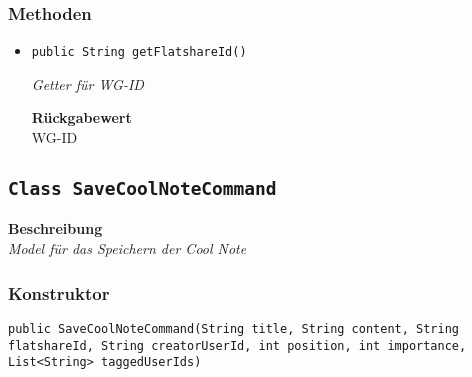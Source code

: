     \subsubsection{Methoden}
    \begin{itemize}
    	\item{\texttt{public String getFlatshareId()}}
    	
    	\textit{Getter für WG-ID}
    	
    	
    	
    	\textbf{Rückgabewert} \\
    	WG-ID
    \end{itemize}
    \subsection{\texttt{Class SaveCoolNoteCommand}}
    \textbf{Beschreibung} \\
    \textit{Model für das Speichern der Cool Note}
    \subsubsection{Konstruktor}
    \texttt{public SaveCoolNoteCommand(String title, String content, String flatshareId, String creatorUserId, int position, int importance, List<String> taggedUserIds)}
